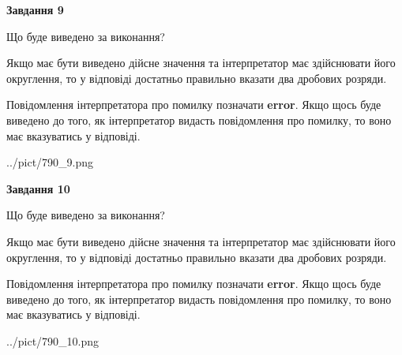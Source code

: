 \documentclass[12pt, ukrainian]{article}
\begin{document}
{\begin {Large}
{\begin {center}\textbf{Завдання 9}\end {center}}\par
Що буде виведено за виконання? \par

Якщо має бути виведено дійсне значення та інтерпретатор має здійснювати його округлення, 
то у відповіді достатньо правильно вказати два дробових розряди.

Повідомлення інтерпретатора про помилку позначати \textbf{error}.
Якщо щось буде виведено до того, як інтерпретатор видасть повідомлення про помилку, 
то воно має вказуватись у відповіді. \par

\begin{center}
	{../pict/790_9.png}
\end{center}
\newpage

{\begin {center}\textbf{Завдання 10}\end {center}}\par
Що буде виведено за виконання? \par

Якщо має бути виведено дійсне значення та інтерпретатор має здійснювати його округлення, 
то у відповіді достатньо правильно вказати два дробових розряди.

Повідомлення інтерпретатора про помилку позначати \textbf{error}.
Якщо щось буде виведено до того, як інтерпретатор видасть повідомлення про помилку, 
то воно має вказуватись у відповіді. \par

\begin{center}
	{../pict/790_10.png}
\end{center}
\newpage

\end {Large}}
\end{document}
